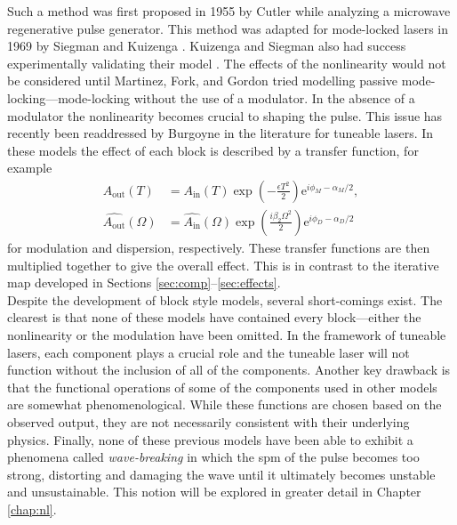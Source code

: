 Such a method was first proposed in 1955 by Cutler \cite{cutler} while analyzing a microwave regenerative pulse generator. This method was adapted for mode-locked lasers in 1969 by Siegman and Kuizenga \cite{kuizenga1970a, siegman}. Kuizenga and Siegman also had success experimentally validating their model \cite{kuizenga1970b, kuizenga1970}. The effects of the nonlinearity would not be considered until Martinez, Fork, and Gordon \cite{martinez1984, martinez1985} tried modelling passive mode-locking---mode-locking without the use of a modulator. In the absence of a modulator the nonlinearity becomes crucial to shaping the pulse. This issue has recently been readdressed by Burgoyne \cite{burgoyne2014} in the literature for tuneable lasers. In these models the effect of each block is described by a transfer function, for example
\begin{align*}
A_{\text{out}}(T) &= A_{\text{in}}(T) \exp \left( - \frac{\epsilon T^2}{2} \right) \textrm{e}^{i \phi_M - \alpha_M / 2}, \\
\widehat{A_{\text{out}}}(\Omega) &= \widehat{A_{\text{in}}}(\Omega) \exp \left( \frac{i \beta_2 \Omega^2}{2} \right) \textrm{e}^{i \phi_D - \alpha_D / 2}
\end{align*}
for modulation and dispersion, respectively. These transfer functions are then multiplied together to give the overall effect. This is in contrast to the iterative map developed in Sections \ref{sec:comp}--\ref{sec:effects}. \\

Despite the development of block style models, several short-comings exist. The clearest is that none of these models have contained every block---either the nonlinearity or the modulation have been omitted. In the framework of tuneable lasers, each component plays a crucial role and the tuneable laser will not function without the inclusion of all of the components. Another key drawback is that the functional operations of some of the components used in other models are somewhat phenomenological. While these functions are chosen based on the observed output, they are not necessarily consistent with their underlying physics. Finally, none of these previous models have been able to exhibit a phenomena called \emph{wave-breaking} in which the \acrlong{spm} of the pulse becomes too strong, distorting and damaging the wave until it ultimately becomes unstable and unsustainable. This notion will be explored in greater detail in Chapter \ref{chap:nl}. \\
